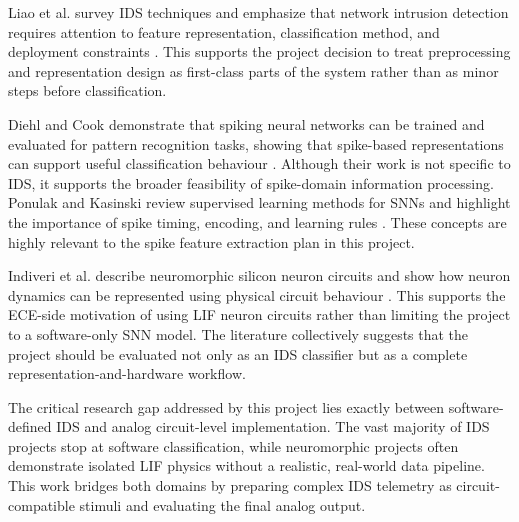 \documentclass{ieeeaccess}
\begin{document}
Liao et al. survey IDS techniques and emphasize that network intrusion detection requires attention to feature representation, classification method, and deployment constraints \cite{Liao2013}. This supports the project decision to treat preprocessing and representation design as first-class parts of the system rather than as minor steps before classification.

Diehl and Cook demonstrate that spiking neural networks can be trained and evaluated for pattern recognition tasks, showing that spike-based representations can support useful classification behaviour \cite{Diehl2015}. Although their work is not specific to IDS, it supports the broader feasibility of spike-domain information processing. Ponulak and Kasinski review supervised learning methods for SNNs and highlight the importance of spike timing, encoding, and learning rules \cite{Ponulak2011}. These concepts are highly relevant to the spike feature extraction plan in this project.

Indiveri et al. describe neuromorphic silicon neuron circuits and show how neuron dynamics can be represented using physical circuit behaviour \cite{Indiveri2011}. This supports the ECE-side motivation of using LIF neuron circuits rather than limiting the project to a software-only SNN model. The literature collectively suggests that the project should be evaluated not only as an IDS classifier but as a complete representation-and-hardware workflow.

The critical research gap addressed by this project lies exactly between software-defined IDS and analog circuit-level implementation. The vast majority of IDS projects stop at software classification, while neuromorphic projects often demonstrate isolated LIF physics without a realistic, real-world data pipeline. This work bridges both domains by preparing complex IDS telemetry as circuit-compatible stimuli and evaluating the final analog output.
\end{document}
